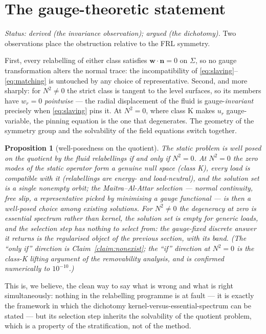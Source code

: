 \documentclass[11pt]{article}
\newtheorem{proposition}{Proposition}
\newcommand{\bw}{\mathbf{w}}
\newcommand{\bn}{\mathbf{n}}
\begin{document}
\section{The gauge-theoretic statement}
\label{sec:gauge}

\emph{Status: derived (the invariance observation); argued (the
dichotomy).} Two observations place the obstruction relative to the
FRL symmetry.

First, every relabelling of either class satisfies
$\bw\cdot\bn = 0$ on $\Sigma$, so no gauge transformation alters the
normal trace: the incompatibility of
\eqref{eq:slaving}--\eqref{eq:matching} is untouched by any choice of
representative. Second, and more sharply: for $N^2 \ne 0$ the strict
class is tangent to the level surfaces, so its members have
$w_r = 0$ \emph{pointwise} --- the radial displacement of the fluid
is gauge-\emph{invariant} precisely when \eqref{eq:slaving} pins it.
At $N^2 = 0$, where class K makes $u_r$ gauge-variable, the pinning
equation is the one that degenerates. The geometry of the symmetry
group and the solvability of the field equations switch together.

\begin{proposition}[well-posedness on the quotient]
\label{prop:quotient}
The static problem is well posed on the quotient by the fluid
relabellings if and only if $N^2 = 0$. At $N^2 = 0$ the zero modes of
the static operator form a genuine null space (class K), every load
is compatible with it (relabellings are energy- and load-neutral),
and the solution set is a single nonempty orbit; the
Maitra--Al-Attar selection --- normal continuity, free slip, a
representative picked by minimising a gauge functional --- is then a
well-posed choice among existing solutions. For $N^2 \ne 0$ the
degeneracy at zero is essential spectrum rather than kernel, the
solution set is empty for generic loads, and the selection step has
nothing to select from: the gauge-fixed discrete answer it returns is
the regularised object of the previous section, with its band.
\emph{(The ``only if'' direction is Claim~\ref{claim:nonexist}; the
``if'' direction at $N^2=0$ is the class-K lifting argument of the
removability analysis, and is confirmed numerically to $10^{-10}$.)}
\end{proposition}

This is, we believe, the clean way to say what is wrong and what is
right simultaneously: nothing in the relabelling programme is at
fault --- it is exactly the framework in which the dichotomy
kernel-versus-essential-spectrum can be stated --- but its selection
step inherits the solvability of the quotient problem, which is a
property of the stratification, not of the method.
\end{document}
